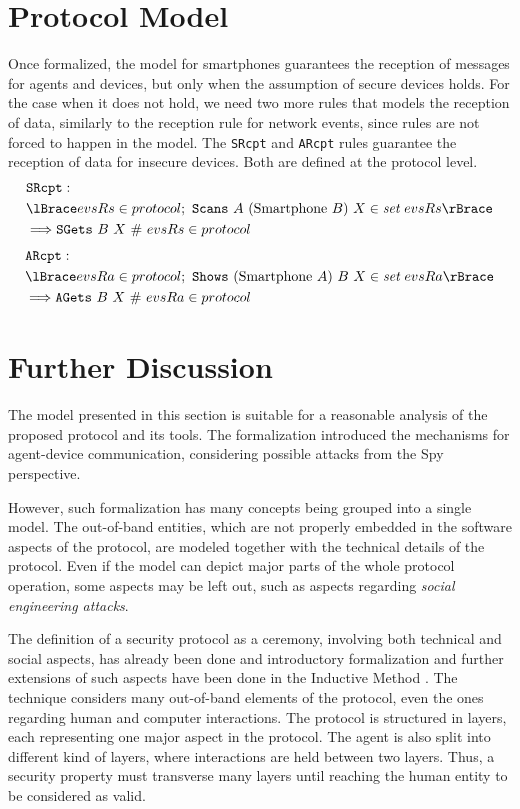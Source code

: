 \section{Protocol Model}
Once formalized, the model for smartphones guarantees the reception of messages for agents and devices, but only when the assumption of secure devices holds. For the case when it does not hold, we need two more rules that models the reception of data, similarly to the reception rule for network events, since rules are not forced to happen in the model. The \texttt{SRcpt} and \texttt{ARcpt} rules guarantee the reception of data for insecure devices. Both are defined at the protocol level.
% 
\begin{align*}
  & \texttt{SRcpt}: \newline \\
  & \lBrace evsRs \in protocol;\ \texttt{Scans}\ A\ (\text{Smartphone}\ B)\ X \in \textit{set}\ evsRs \rBrace\\
  & \Longrightarrow \texttt{SGets}\ B\ X\ \#\ evsRs \in protocol
\end{align*}
%
\begin{align*}
  & \texttt{ARcpt}: \newline \\
  & \lBrace evsRa \in protocol;\ \texttt{Shows}\ (\text{Smartphone}\ A)\ B\ X \in \textit{set}\ evsRa \rBrace\\
  & \Longrightarrow \texttt{AGets}\ B\ X\ \#\ evsRa \in protocol
\end{align*}
%

\section{Further Discussion}
The model presented in this section is suitable for a reasonable analysis of the proposed protocol and its tools. The formalization introduced the mechanisms for agent-device communication, considering possible attacks from the Spy perspective. 

However, such formalization has many concepts being grouped into a single model. The out-of-band entities, which are not properly embedded in the software aspects of the protocol, are modeled together with the technical details of the protocol. Even if the model can depict major parts of the whole protocol operation, some aspects may be left out, such as aspects regarding \textit{social engineering attacks}.

The definition of a security protocol as a ceremony, involving both technical and social aspects, has already been done \cite{Ellison07} and introductory formalization and further extensions of such aspects have been done in the Inductive Method \cite{Bella2012}. The technique considers many out-of-band elements of the protocol, even the ones regarding human and computer interactions. The protocol is structured in layers, each representing one major aspect in the protocol. The agent is also split into different kind of layers, where interactions are held between two layers. Thus, a security property must transverse many layers until reaching the human entity to be considered as valid.

